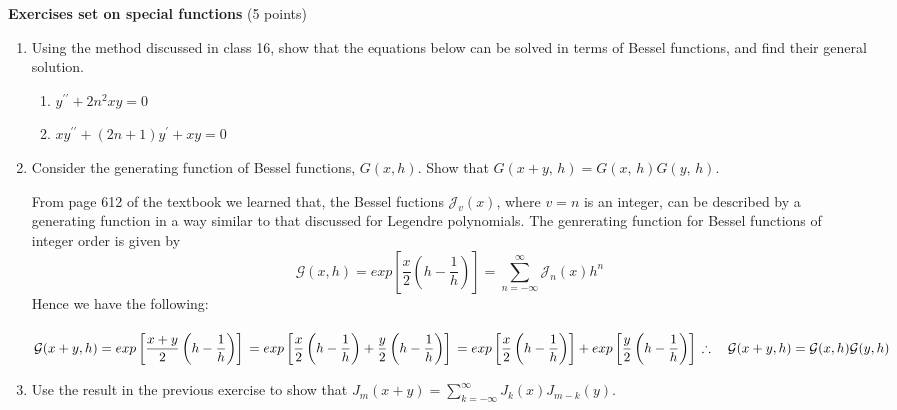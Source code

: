 \documentclass[fleqn]{article}
\begin{document}
  \textbf{Exercises set on special functions} (5 points)
  \begin{enumerate}
    \item Using the method discussed in class 16, show that the equations below can be solved in terms of Bessel functions, and find their general solution.
    
    \begin{enumerate}
    \item $y^{\prime \prime }+2n^{2}xy=0$
    
    \item $xy^{\prime \prime }+\left( 2n+1\right) y^{\prime }+xy=0$
    \end{enumerate}
    
    
    
    \item Consider the generating function of Bessel functions, $G(x,h)$. Show that $G\left( x+y,\,h\right) =G\left( x,\,h\right) G\left(
    y,\,h\right) .$

      \textcolor{hwColor}{
        From page 612 of the textbook we learned that, the Bessel fuctions $\mathcal{J}_v(x)$, where $v=n$ is an integer,
        can be described by a generating function in a way similar to that discussed for Legendre polynomials. The genrerating 
        function for Bessel functions of integer order is given by 
        $$\mathcal{G}(x,h)=exp \left[\dfrac{x}{2}(h-\dfrac{1}{h})\right]=\sum\limits_{n=-\infty}^{\infty}\mathcal{J}_n(x) h^n$$ 
        Hence we have the following: 
        \\
        \\
        $
          \mathcal{G}(x+y, h)= exp\left[\dfrac{x+y}{2} \left(h-\dfrac{1}{h}\right)\right]
          \\
          \\
          =exp \left[\dfrac{x}{2} \left(h-\dfrac{1}{h}\right)+\dfrac{y}{2} \left(h-\dfrac{1}{h}\right)\right]
          \\
          \\
          =exp \left[\dfrac{x}{2} \left(h-\dfrac{1}{h}\right)\right]+exp \left[\dfrac{y}{2} \left(h-\dfrac{1}{h}\right)\right]
          \\
          \\
          \therefore ~~~ \mathcal{G}(x+y, h)=\mathcal{G}(x,h) \mathcal{G}(y,h)
        $
      }
    
    \item Use the result in the previous exercise to show that $J_{m}\left( x+y\right) =\sum\limits_{k=-\infty}^{\infty }J_{k}\left( x\right) J_{m-k}\left( y\right) .$
    

\end{enumerate}
\end{document}
